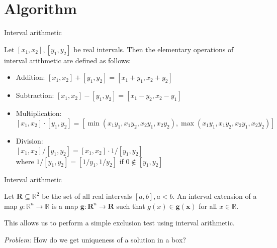 \documentclass[german,10pt,xcolor=colortbl,compress,handout]{beamer}
\begin{document}
\section{Algorithm}
\begin{frame}{Interval arithmetic}
	\begin{definition}
	Let $[x_1,x_2], [y_1,y_2]$ be real intervals. Then the elementary operations of interval arithmetic are defined as follows:
	\begin{itemize}
		\item Addition: $[x_1,x_2] + [y_1,y_2] = [x_1+y_1,x_2+y_2]$
		\item Subtraction: $[x_1,x_2] - [y_1,y_2] = [x_1-y_2,x_2-y_1]$
		\item Multiplication: $[x_1,x_2] \cdot [y_1,y_2] = [\min(x_1y_1,x_1y_2,x_2y_1,x_2y_2), \max(x_1y_1,x_1y_2,x_2y_1,x_2y_2)]$
		\item Division: \\ $[x_1,x_2] / [y_1,y_2] = [x_1,x_2] \cdot 1/[y_1,y_2]$ \\where $1/[y_1,y_2]= [1/y_1, 1/y_2]$ if $0 \notin [y_1,y_2] $
	\end{itemize}
	\end{definition}

\end{frame}
\begin{frame}{Interval arithmetic}
    \begin{definition}
        Let  $\textbf{R} \subseteq \mathbb{R}^2$ be the set of all real intervals $[a,b],
        a < b$. An interval extension of a map $g: \mathbb{R}^n \to \mathbb{R}$ is a map
        $\textbf{g}: \textbf{R}^n \to \textbf{R}$ such that $g(x) \in
        \textbf{g}(\textbf{x}) $ for all $x \in \mathbb{R}$.
    \end{definition}

    This allows us to perform a simple exclusion test using interval arithmetic.
    \bigskip

    \emph{Problem:} How do we get uniqueness of a solution in a box?
\end{frame}
\end{document}
